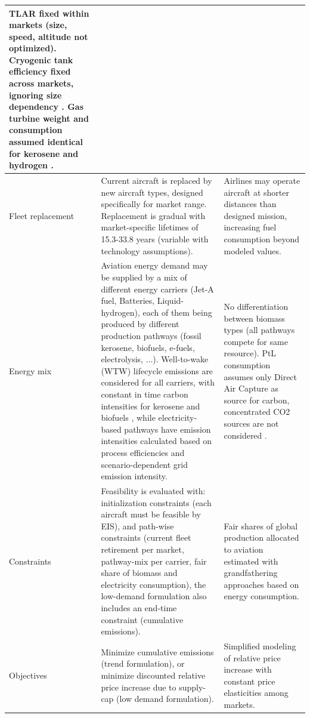 \documentclass[a4paper,fleqn]{cas-dc}
\begin{document}
\begin{table}[htbp]
{\begin{minipage}{\textheight}
\begin{tabular}{p{}|p{}|p{}}
TLAR fixed within markets (size, speed, altitude not optimized). Cryogenic tank efficiency fixed across markets, ignoring size dependency \cite{adler_hydrogen-powered_2023, ati_cryogenic}. Gas turbine weight and consumption assumed identical for kerosene and hydrogen \cite{mourouzidis_abating_2024}.
\\
\midrule
Fleet replacement &
Current aircraft is replaced by new aircraft types, designed specifically for market range. Replacement is gradual with market-specific lifetimes of 15.3-33.8 years (variable with technology assumptions). &
Airlines may operate aircraft at shorter distances than designed mission, increasing fuel consumption beyond modeled values.
\\
\midrule
Energy mix &
Aviation energy demand may be supplied by a mix of different energy carriers (Jet-A fuel, Batteries, Liquid-hydrogen), each of them being produced by different production pathways (fossil kerosene, biofuels, e-fuels, electrolysis, ...). Well-to-wake (WTW) lifecycle emissions are considered for all carriers, with constant in time carbon intensities for kerosene and biofuels \cite{jing_understanding_2022, NEULING201854}, while electricity-based pathways have emission intensities calculated based on process efficiencies \cite{wallington_green_2024} and scenario-dependent grid emission intensity. &
No differentiation between biomass types (all pathways compete for same resource). PtL consumption assumes only Direct Air Capture as source for carbon, concentrated CO2 sources are not considered \cite{drunert_ptl}.
\\
\midrule
Constraints &
Feasibility is evaluated with: initialization constraints (each aircraft must be feasible by EIS), and path-wise constraints (current fleet retirement per market, pathway-mix per carrier, fair share of biomass and electricity consumption), the low-demand formulation also includes an end-time constraint (cumulative emissions). &
Fair shares of global production allocated to aviation estimated with grandfathering approaches based on energy consumption.
\\
\midrule
Objectives &
Minimize cumulative emissions (trend formulation), or minimize discounted relative price increase due to supply-cap (low demand formulation). & Simplified modeling of relative price increase with constant price elasticities among markets. \\
\bottomrule
\end{tabular}
\label{tab:model_assumptions}
    \end{minipage}
}
\end{table}
\end{document}
